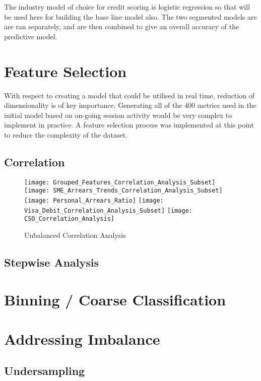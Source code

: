 The industry model of choice for credit scoring is logistic regression so that will be used here for building the base line model also. The two segmented models are are ran separately, and are then combined to give an overall accuracy of the predictive model. 


\section{Feature Selection}
With respect to creating a model that could be utilised in real time, reduction of dimensionality is of key importance. Generating all of the 400 metrics used in the initial model based on on-going session activity would be very complex to implement in practice. A feature selection process was implemented at this point to reduce the complexity of the dataset. 


\subsection{Correlation}

\begin{figure}[htp]
	\centering
	\texttt{[image: Grouped\_Features\_Correlation\_Analysis\_Subset]}\quad
	\texttt{[image: SME\_Arrears\_Trends\_Correlation\_Analysis\_Subset]}\quad
	\texttt{[image: Personal\_Arrears\_Ratio]}
	\medskip
	\texttt{[image: Visa\_Debit\_Correlation\_Analysis\_Subset]}\quad
	\texttt{[image: CSO\_Correlation\_Analysis]}
\caption{Unbalanced Correlation Analysis}
\label{fig:unbal_corr_analysis}
\end{figure}
	


\subsection{Stepwise Analysis}

\section{Binning / Coarse Classification}

\section{Addressing Imbalance}
\subsection{Undersampling}

